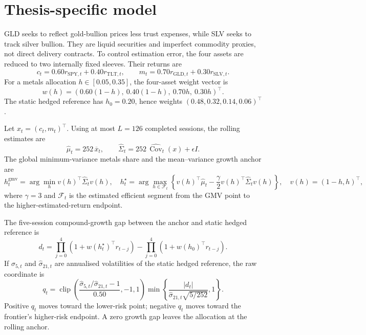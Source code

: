 

\section{Thesis-specific model}\label{sec:thesis-math}

GLD seeks to reflect gold-bullion prices less trust expenses, while SLV seeks to track silver
bullion. They are liquid securities and imperfect commodity proxies, not direct delivery contracts.
To control estimation error, the four assets are reduced to two internally fixed sleeves. Their
returns are
\begin{equation}\label{eq:tm-sleeves}
 c_t=0.60r_{\mathrm{SPY},t}+0.40r_{\mathrm{TLT},t},
 \qquad
 m_t=0.70r_{\mathrm{GLD},t}+0.30r_{\mathrm{SLV},t}.
\end{equation}
For a metals allocation \(h\in[0.05,0.35]\), the four-asset weight vector is
\begin{equation}\label{eq:tm-weights}
 w(h)=\left(0.60(1-h),\ 0.40(1-h),\ 0.70h,\ 0.30h\right)^{\top}.
\end{equation}
The static hedged reference has \(h_0=0.20\), hence weights
\((0.48,0.32,0.14,0.06)^{\top}\).

Let \(x_t=(c_t,m_t)^{\top}\). Using at most \(L=126\) completed sessions, the rolling estimates
are
\begin{equation}\label{eq:tm-moments}
 \widehat\mu_t=252\,\overline x_t,
 \qquad
 \widehat\Sigma_t=252\,\widehat{\operatorname{Cov}}_t(x)+\epsilon I.
\end{equation}
The global minimum-variance metals share and the mean--variance growth anchor are
\begin{equation}\label{eq:tm-anchor}
 h_t^{\mathrm{gmv}}=\arg\min_h v(h)^{\top}\widehat\Sigma_t v(h),
 \quad
 h_t^{\star}=\arg\max_{h\in\mathcal F_t}
 \left\{v(h)^{\top}\widehat\mu_t-\frac{\gamma}{2}
 v(h)^{\top}\widehat\Sigma_t v(h)\right\},
 \quad v(h)=(1-h,h)^{\top},
\end{equation}
where \(\gamma=3\) and \(\mathcal F_t\) is the estimated efficient segment from the GMV point to
the higher-estimated-return endpoint.

The five-session compound-growth gap between the anchor and static hedged reference is
\begin{equation}\label{eq:tm-growth-gap}
 d_t=\prod_{j=0}^{4}\left(1+w(h_t^{\star})^{\top}r_{t-j}\right)
 -\prod_{j=0}^{4}\left(1+w(h_0)^{\top}r_{t-j}\right).
\end{equation}
If \(\widehat\sigma_{5,t}\) and \(\widehat\sigma_{21,t}\) are annualised volatilities of the
static hedged reference, the raw coordinate is
\begin{equation}\label{eq:tm-coordinate}
 q_t=\operatorname{clip}\!\left(
 \frac{\widehat\sigma_{5,t}/\widehat\sigma_{21,t}-1}{0.50},-1,1\right)
 \min\!\left\{\frac{|d_t|}{\widehat\sigma_{21,t}\sqrt{5/252}},1\right\}.
\end{equation}
Positive \(q_t\) moves toward the lower-risk point; negative \(q_t\) moves toward the frontier's
higher-risk endpoint. A zero growth gap leaves the allocation at the rolling anchor.

